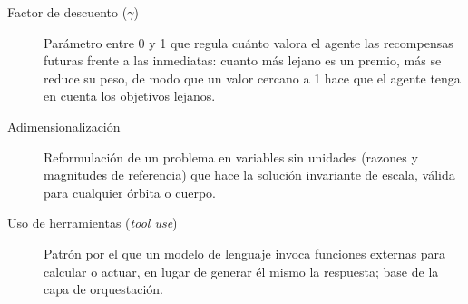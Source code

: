 \begin{description}
  \item[Factor de descuento ($\gamma$)] Parámetro entre 0 y 1 que regula cuánto valora el agente las recompensas futuras frente a las inmediatas: cuanto más lejano es un premio, más se reduce su peso, de modo que un valor cercano a 1 hace que el agente tenga en cuenta los objetivos lejanos.
  \item[Adimensionalización] Reformulación de un problema en variables sin unidades (razones y magnitudes de referencia) que hace la solución invariante de escala, válida para cualquier órbita o cuerpo.
  \item[Uso de herramientas (\emph{tool use})] Patrón por el que un modelo de lenguaje invoca funciones externas para calcular o actuar, en lugar de generar él mismo la respuesta; base de la capa de orquestación.
\end{description}
